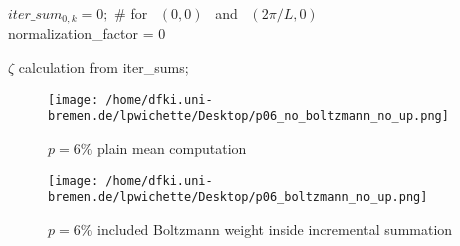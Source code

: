 \documentclass{article}
\begin{document}
\begin{algorithm}

$iter\_sum_{0, k} = 0;$ \qquad \# for~ $(0, 0)$ ~and~ $(2\pi/L, 0)$\\
normalization\_factor = 0\;

$\zeta$ calculation from iter\_sums;\

\end{algorithm}

\newpage

\begin{figure}[h!]
  \centering
  \texttt{[image: /home/dfki.uni-bremen.de/lpwichette/Desktop/p06\_no\_boltzmann\_no\_up.png]}
  \caption{$p=6\%$ plain mean computation}
  \label{fig:your_label}
\end{figure}

\begin{figure}[h!]
  \centering
  \texttt{[image: /home/dfki.uni-bremen.de/lpwichette/Desktop/p06\_boltzmann\_no\_up.png]}
  \caption{$p=6\%$ included Boltzmann weight inside incremental summation}
  \label{fig:your_label}
\end{figure}
\end{document}
